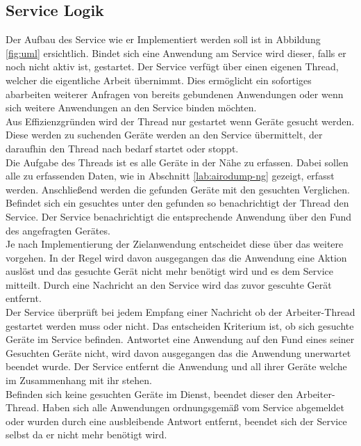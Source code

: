 \documentclass[]{report}
\begin{document}
\subsection{Service Logik}
Der Aufbau des Service wie er Implementiert werden soll ist in Abbildung \ref{fig:uml} ersichtlich. Bindet sich eine Anwendung am Service wird dieser, falls er noch nicht aktiv ist, gestartet. Der Service verfügt über einen eigenen Thread, welcher die eigentliche Arbeit übernimmt. Dies ermöglicht ein sofortiges abarbeiten weiterer Anfragen von bereits gebundenen Anwendungen oder wenn sich weitere Anwendungen an den Service binden möchten. \\
Aus Effizienzgründen wird der Thread nur gestartet wenn Geräte gesucht werden. Diese werden zu suchenden Geräte werden an den Service übermittelt, der daraufhin den Thread nach bedarf startet oder stoppt. \\
Die Aufgabe des Threads ist es alle Geräte in der Nähe zu erfassen. Dabei sollen alle zu erfassenden Daten, wie in Abschnitt \ref{lab:airodump-ng} gezeigt, erfasst werden. Anschließend werden die gefunden Geräte mit den gesuchten Verglichen. Befindet sich ein gesuchtes unter den gefunden so benachrichtigt der Thread den Service. Der Service benachrichtigt die entsprechende Anwendung über den Fund des angefragten Gerätes. \\ 
Je nach Implementierung der Zielanwendung entscheidet diese über das weitere vorgehen. In der Regel wird davon ausgegangen das die Anwendung eine Aktion auslöst und das gesuchte Gerät nicht mehr benötigt wird und es dem Service mitteilt.  
Durch eine Nachricht an den Service wird das zuvor gescuhte Gerät entfernt.\\
Der Service überprüft bei jedem Empfang einer Nachricht ob der Arbeiter-Thread gestartet werden muss oder nicht. Das entscheiden Kriterium ist, ob sich gesuchte Geräte im Service befinden. Antwortet eine Anwendung auf den Fund eines seiner Gesuchten Geräte nicht, wird davon ausgegangen das die Anwendung unerwartet beendet wurde. Der Service entfernt die Anwendung und all ihrer Geräte welche im Zusammenhang mit ihr stehen.\\
Befinden sich keine gesuchten Geräte im Dienst, beendet dieser den Arbeiter-Thread. Haben sich alle Anwendungen ordnungsgemäß vom Service abgemeldet oder wurden durch eine ausbleibende Antwort entfernt, beendet sich der Service selbst da er nicht mehr benötigt wird.
\newpage
\end{document}
